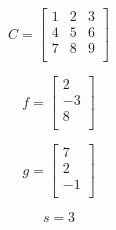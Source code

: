\begin{equation}\nonumber
C = \left[
\begin{array}{rrr}
 1 & 2 & 3 \\
 4 & 5 & 6 \\
 7 & 8 & 9 \\
\end{array}\right]
\end{equation}

\begin{equation}\nonumber
f = \left[
\begin{array}{r}
 2 \\
-3 \\
 8 \\
\end{array}\right]
\end{equation}

\begin{equation}\nonumber
g = \left[
\begin{array}{r}
  7 \\
  2 \\
 -1 \\
\end{array}\right]
\end{equation}

\begin{equation}\nonumber
s = 3
\end{equation}



